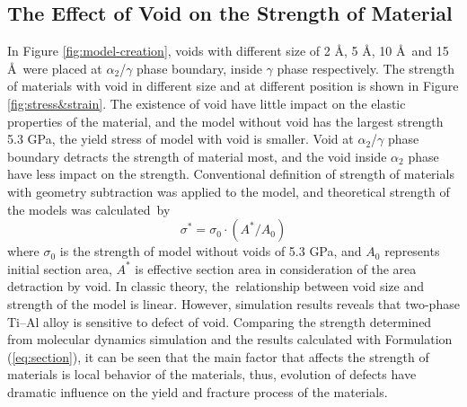 \documentclass[materials,article,accept,moreauthors,pdftex,10pt,a4paper]{Definitions/mdpi}
\begin{document}
\subsection{The Effect of Void on the Strength of Material}


In Figure \ref{fig:model-creation}, voids with different size of 2 \AA, 5 \AA, 10 \AA\ and 15 \AA\ were placed  at $\alpha_2$/$\gamma$ phase boundary, inside $\gamma$ phase respectively. The strength of materials with void in different size and at different position is shown in Figure \ref{fig:stress&strain}. The existence of void have little impact on the elastic properties of the material, and the model without void has the largest strength 5.3 GPa, the yield stress of model with void is smaller. Void at $\alpha_2$/$\gamma$ phase boundary  detracts the strength of  material most, and the void inside $\alpha_2$ phase  have less impact on the strength.
Conventional definition of strength of materials with geometry subtraction was applied to the model, and theoretical strength of the models was calculated~by
\begin{equation} \label{eq:section}
\sigma^* = \sigma_0 \cdot({A^*}/{A_0})
\end{equation}
where $\sigma_0$ is the strength of model without voids of 5.3 GPa, and $A_0$ represents initial section area,  $A^*$ is effective section area in consideration of the area detraction by void.  In classic theory, the~relationship between void size and strength of the model is linear. However, simulation results reveals that two-phase Ti--Al alloy is sensitive to defect of void.  Comparing the strength determined from molecular dynamics simulation and the results calculated with Formulation (\ref{eq:section}), it can be seen that the main factor that affects the strength of materials is local behavior of the materials, thus, evolution of defects have dramatic influence on the yield and fracture process of the materials.
\end{document}
